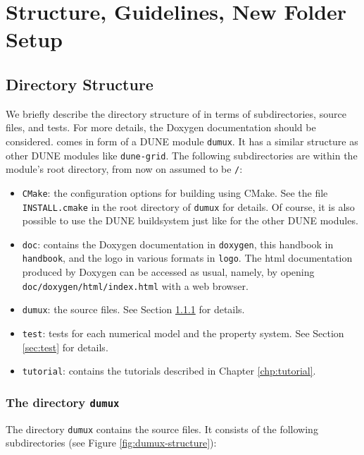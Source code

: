 \chapter{Structure, Guidelines, New Folder Setup}

\section{Directory Structure}

We briefly describe the directory structure of \Dumux in terms 
of subdirectories, source files, and tests. For more details, 
the Doxygen documentation should be considered. 
\Dumux comes in form of a DUNE module \texttt{dumux}. 
It has a similar structure as other DUNE modules like \texttt{dune-grid}. 
The following subdirectories are within the module's root directory, 
from now on assumed to be \texttt{/}: 
\begin{itemize} 
\item \texttt{CMake}: the configuration options 
for building \Dumux using CMake. See the file \texttt{INSTALL.cmake} in 
the root directory of \texttt{dumux} for details. Of course, 
it is also possible to use the DUNE buildsystem just like for the other 
DUNE modules.
\item \texttt{doc}: contains the Doxygen documentation in \texttt{doxygen}, 
this handbook in \texttt{handbook}, and the \Dumux logo in various formats in 
\texttt{logo}. The html documentation produced by Doxygen can be accessed as usual, 
namely, by opening \texttt{doc/doxygen/html/index.html} with a web browser. 
\item \texttt{dumux}: the \Dumux source files. See Section \ref{sec:dumux} for details. 
\item \texttt{test}: tests for each numerical model and the property system. 
See Section \ref{sec:test} for details. 
\item \texttt{tutorial}: contains the tutorials described in Chapter \ref{chp:tutorial}. 
\end{itemize}



\subsection{The directory \texttt{dumux}}\label{sec:dumux}

The directory \texttt{dumux} contains the \Dumux source files. It consists of the following subdirectories (see Figure \ref{fig:dumux-structure}): 

